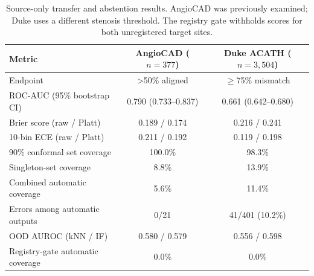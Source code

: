 \begin{table}[t]
\centering
\caption{Source-only transfer and abstention results. AngioCAD was previously examined; Duke uses a different stenosis threshold. The registry gate withholds scores for both unregistered target sites.}
\label{tab:domain-guard-transfer}
\begin{tabular}{lcc}
\toprule
Metric & AngioCAD ($n=377$) & Duke ACATH ($n=3{,}504$) \\
\midrule
Endpoint & >50\% aligned & $\geq$75\% mismatch \\
ROC-AUC (95\% bootstrap CI) & 0.790 (0.733--0.837) & 0.661 (0.642--0.680) \\
Brier score (raw / Platt) & 0.189 / 0.174 & 0.216 / 0.241 \\
10-bin ECE (raw / Platt) & 0.211 / 0.192 & 0.119 / 0.198 \\
90\% conformal set coverage & 100.0\% & 98.3\% \\
Singleton-set coverage & 8.8\% & 13.9\% \\
Combined automatic coverage & 5.6\% & 11.4\% \\
Errors among automatic outputs & 0/21 & 41/401 (10.2\%) \\
OOD AUROC (kNN / IF) & 0.580 / 0.579 & 0.556 / 0.598 \\
Registry-gate automatic coverage & 0.0\% & 0.0\% \\
\bottomrule
\end{tabular}
\end{table}
